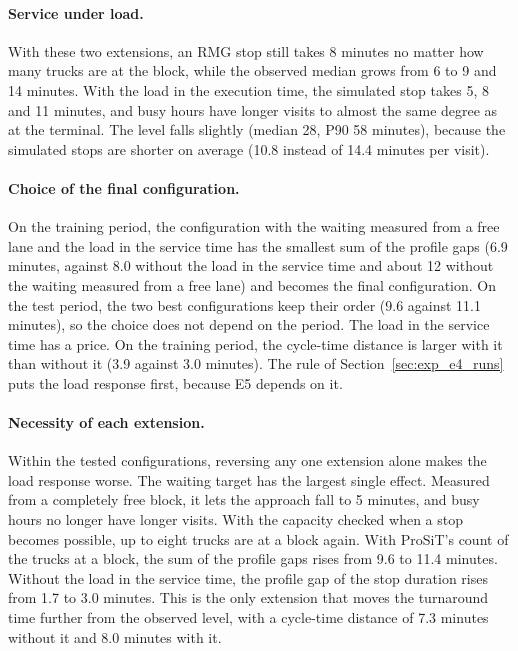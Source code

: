\paragraph{Service under load.} With these two extensions, an RMG stop still takes
8 minutes no matter how many trucks are at the block, while the observed median grows
from 6 to 9 and 14 minutes. With the load in the execution time, the simulated stop
takes 5, 8 and 11 minutes, and busy hours have longer visits to almost the same degree
as at the terminal. The level falls
slightly (median 28, P90 58 minutes), because the simulated stops are shorter on
average (10.8 instead of 14.4 minutes per visit).

\paragraph{Choice of the final configuration.} On the training period, the
configuration with the waiting measured from a free lane and the load in the service
time has the smallest sum of the profile gaps (6.9 minutes, against 8.0 without the
load in the service time and about 12 without the waiting measured from a free lane)
and becomes the final configuration. On the test period, the two best configurations
keep their order (9.6 against 11.1
minutes), so the choice does not depend on the period. The load in the service time
has a price. On the training period, the cycle-time distance is larger with it than
without it (3.9 against 3.0 minutes). The rule of Section~\ref{sec:exp_e4_runs} puts
the load response first, because E5 depends on it.

\paragraph{Necessity of each extension.} Within the tested configurations, reversing
any one extension alone makes the load response worse. The waiting target has the largest
single effect. Measured from a completely free block, it lets the approach fall to 5
minutes, and busy hours no longer have longer visits. With
the capacity checked when a stop becomes possible, up to eight trucks are at a block
again. With ProSiT's count of the trucks at a block, the sum of the profile gaps rises
from 9.6 to 11.4 minutes. Without the load in the service time, the profile gap of the
stop duration rises from 1.7 to 3.0 minutes. This is the only extension that moves
the turnaround time further from the observed level, with a cycle-time distance of
7.3 minutes without it and 8.0 minutes with it.

